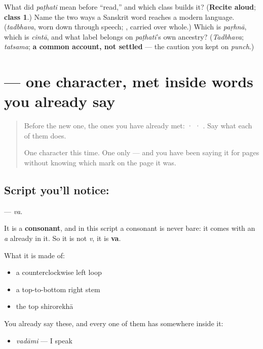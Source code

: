 \begin{tcolorbox}[breakable,colback=teal!4,colframe=teal!35!black,title={Before you move on}]
What did \emph{paṭhati} mean before \textquotedblleft{}read,\textquotedblright{} and which class builds it? (\textbf{Recite aloud}; \textbf{class 1}.) Name the two ways a Sanskrit word reaches a modern language. (\emph{tadbhava}, worn down through speech; \textbf{}, carried over whole.) Which is \emph{paṛhnā}, which is \emph{cintā}, and what label belongs on \emph{paṭhati}'s own ancestry? (\emph{Tadbhava}; \emph{tatsama}; \textbf{a common account, not settled} — the caution you kept on \emph{punch}.)
\end{tcolorbox}
\section[\texorpdfstring{\sk{व} (va)}{व (va)}]{ — one character, met inside words you already say}

\label{lesson:SA-S208-letter-va}



\begin{quote}
Before the new one, the ones you have already met:  ·  · . Say what each of them does.

One character this time. One only — and you have been saying it for pages without knowing which mark on the page it was.
\end{quote}

\subsection*{Script you'll notice: }
\textbf{} — \emph{va}.

It is a \textbf{consonant}, and in this script a consonant is never bare: it comes with an \emph{a} already in it. So it is not \emph{v}, it is \textbf{va}.

What it is made of:

\begin{itemize}
\raggedright
  \item a counterclockwise left loop
  \item a top-to-bottom right stem
  \item the top shirorekhā
\end{itemize}

You already say these, and every one of them has  somewhere inside it:

\begin{itemize}
\raggedright
  \item \textbf{} \emph{vadāmi} — I speak
\end{itemize}


